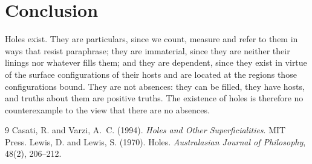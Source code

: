 \documentclass{situationist-preprint}
\begin{document}
\section{Conclusion}

Holes exist. They are particulars, since we count, measure and refer to them in ways that resist paraphrase; they are immaterial, since they are neither their linings nor whatever fills them; and they are dependent, since they exist in virtue of the surface configurations of their hosts and are located at the regions those configurations bound. They are not absences: they can be filled, they have hosts, and truths about them are positive truths. The existence of holes is therefore no counterexample to the view that there are no absences.

\begin{thebibliography}{9}\small
{} Casati, R. and Varzi, A.~C. (1994). \emph{Holes and Other Superficialities}. MIT Press.
 Lewis, D. and Lewis, S. (1970). Holes. \emph{Australasian Journal of Philosophy}, 48(2), 206--212.
\end{thebibliography}
\end{document}
